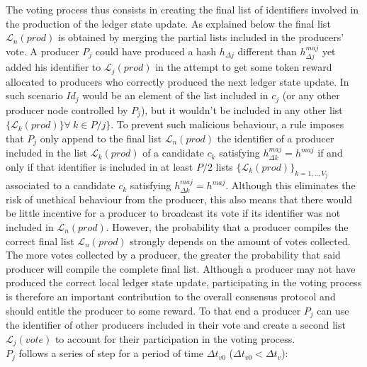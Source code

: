 The voting process thus consists in creating the final list of identifiers involved in the production of the ledger state update. As explained below the final list $\mathcal{L}_n(prod)$ is obtained by merging the partial lists included in the producers' vote. A producer $P_j$ could have produced a hash $h_{\Delta j}$ different than $h^{maj}_{\Delta j}$ yet added his identifier to $\mathcal{L}_j(prod)$ in the attempt to get some token reward allocated to producers who correctly produced the next ledger state update. In such scenario $Id_j$ would be an element of the list included in $c_j$ (or any other producer node controlled by $P_j$), but it wouldn't be included in any other list $\{\mathcal{L}_k(prod)\} \forall~k \in P/j\}$. To prevent such malicious behaviour, a rule imposes that $P_j$ only append to the final list $\mathcal{L}_n(prod)$ the identifier of a producer included in the list $\mathcal{L}_k(prod)$ of a candidate $c_k$ satisfying $h^{maj}_{\Delta k} = h^{maj}$ if and only if that identifier is included in at least $P/2$ lists $\{\mathcal{L}_{k}(prod)\}_{k=1,..,V_j}$ associated to a candidate $c_{k}$ satisfying $h^{maj}_{\Delta k} = h^{maj}$. Although this eliminates the risk of unethical behaviour from the producer, this also means that there would be little incentive for a producer to broadcast its vote if its identifier was not included in $\mathcal{L}_n(prod)$. However, the probability that a producer compiles the correct final list $\mathcal{L}_n(prod)$ strongly depends on the amount of votes collected. The more votes collected by a producer, the greater the probability that said producer will compile the complete final list. Although a producer may not have produced the correct local ledger state update, participating in the voting process is therefore an important contribution to the overall consensus protocol and should entitle the producer to some reward. To that end a producer $P_j$ can use the identifier of other producers included in their vote and create a second list $\mathcal{L}_j(vote)$ to account for their participation in the voting process. \\
 
$P_j$ follows a series of step for a period of time $\Delta t_{v0}$ ($\Delta t_{v0} < \Delta t_{v}$):

